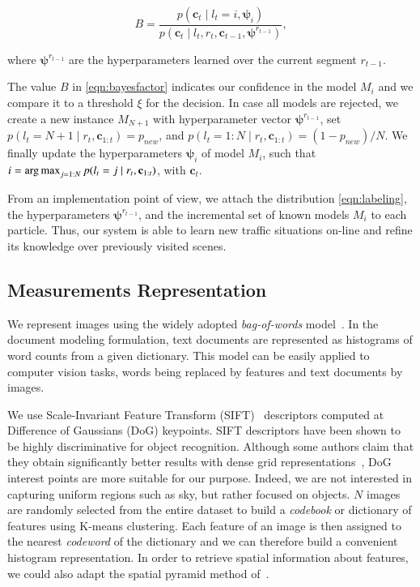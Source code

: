 \begin{equation}
\label{eqn:bayesfactor}
B = \frac{p(\mathbf{c}_t\mid l_t=i,\boldsymbol{\psi}_i)}{p(\mathbf{c}_t\mid
l_t,r_t,\mathbf{c}_{t-1},\boldsymbol{\psi}^{r_{t-1}})},
\end{equation}

where $\boldsymbol{\psi}^{r_{t-1}}$ are the hyperparameters learned over the
current segment $r_{t-1}$.

The value $B$ in \eqref{eqn:bayesfactor} indicates our confidence in the model
$M_i$ and we compare it to a threshold $\xi$ for the decision. In case all
models are rejected, we create a new instance $M_{N+1}$ with hyperparameter
vector $\boldsymbol{\psi}^{r_{t-1}}$, set $p(l_t=N+1\mid
r_t,\mathbf{c}_{1:t})=p_{new}$, and $p(l_t=1:N\mid r_t,\mathbf{c}_{1:t})=
(1-p_{new})/N$. We finally update the hyperparameters $\boldsymbol{\psi}_i$ of
model $M_i$, such that $i=\operatorname*{arg\,max}_{j=1:N}p(l_t=j\mid
r_t,\mathbf{c}_{1:t})$, with $\mathbf{c}_t$.

From an implementation point of view, we attach the distribution
\eqref{eqn:labeling}, the hyperparameters $\boldsymbol{\psi}^{r_{t-1}}$, and the
incremental set of known models $M_i$ to each particle. Thus, our system is able
to learn new traffic situations on-line and refine its knowledge over
previously visited scenes.

\subsection{Measurements Representation}
We represent images using the widely adopted \emph{bag-of-words}
model~\cite{sivic03video}. In the document modeling formulation, text documents
are represented as histograms of word counts from a given dictionary. This model
can be easily applied to computer vision tasks, words being replaced by features
and text documents by images.

We use Scale-Invariant Feature Transform (SIFT)~\cite{lowe04distinctive}
descriptors computed at Difference of Gaussians (DoG) keypoints. SIFT
descriptors have been shown to be highly discriminative for object recognition.
Although some authors claim that they obtain significantly better results with
dense grid representations~\cite{feifei05bayesian}, DoG interest points are more
suitable for our purpose. Indeed, we are not interested in capturing uniform
regions such as sky, but rather focused on objects. $N$ images are randomly
selected from the entire dataset to build a \emph{codebook} or dictionary of
features using K-means clustering. Each feature of an image is then assigned to
the nearest \emph{codeword} of the dictionary and we can therefore build a
convenient histogram representation. In order to retrieve spatial information
about features, we could also adapt the spatial pyramid method
of~\cite{lazebnik06beyond}.

